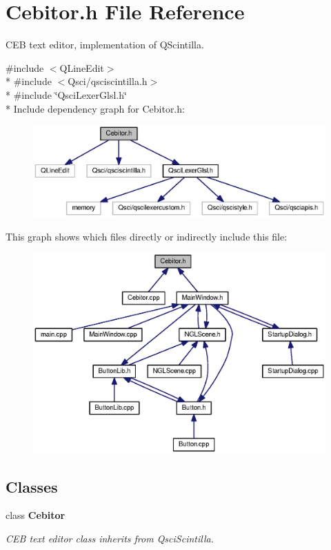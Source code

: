 \section{Cebitor.\-h File Reference}
\label{_cebitor_8h}


C\-E\-B text editor, implementation of Q\-Scintilla.  


{\ttfamily \#include $<$Q\-Line\-Edit$>$}\\*
{\ttfamily \#include $<$Qsci/qsciscintilla.\-h$>$}\\*
{\ttfamily \#include \char`\"{}Qsci\-Lexer\-Glsl.\-h\char`\"{}}\\*
Include dependency graph for Cebitor.\-h\-:\nopagebreak
\begin{figure}[H]
\begin{center}
\leavevmode
\includegraphics[width=350pt]{_cebitor_8h__incl}
\end{center}
\end{figure}
This graph shows which files directly or indirectly include this file\-:
\nopagebreak
\begin{figure}[H]
\begin{center}
\leavevmode
\includegraphics[width=350pt]{_cebitor_8h__dep__incl}
\end{center}
\end{figure}
\subsection*{Classes}
\begin{DoxyCompactItemize}
\item 
class {\bf Cebitor}
\begin{DoxyCompactList}\small\item\em C\-E\-B text editor class inherits from Qsci\-Scintilla. \end{DoxyCompactList}\end{DoxyCompactItemize}



